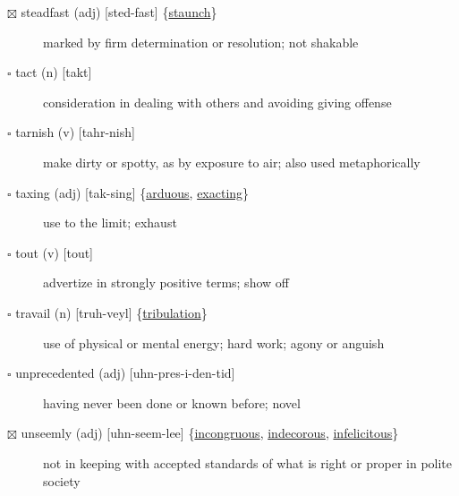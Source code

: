 \documentclass[11pt]{article}
\begin{document}
\begin{description}
\item[{$\boxtimes$ \label{orge0b688b}steadfast (adj) [sted-fast] \{\hyperref[org078ae16]{staunch}\}}] marked by firm determination or resolution; not shakable
\item[{$\square$ tact (n) [takt]}] consideration in dealing with others and avoiding giving offense
\item[{$\square$ tarnish (v) [tahr-nish]}] make dirty or spotty, as by exposure to air; also used metaphorically
\item[{$\square$ \label{org6476319}taxing (adj) [tak-sing] \{\hyperref[org544fb36]{arduous}, \hyperref[org7c24807]{exacting}\}}] use to the limit; exhaust
\item[{$\square$ tout (v) [tout]}] advertize in strongly positive terms; show off
\item[{$\square$ \label{orgde75c05}travail (n) [truh-veyl] \{\hyperref[orgdf85c85]{tribulation}\}}] use of physical or mental energy; hard work; agony or anguish
\item[{$\square$ unprecedented (adj) [uhn-pres-i-den-tid]}] having never been done or known before; novel
\item[{$\boxtimes$ \label{org5b5b913}unseemly (adj) [uhn-seem-lee] \{\hyperref[org42977a6]{incongruous}, \hyperref[org6f6aa07]{indecorous}, \hyperref[org04e38e0]{infelicitous}\}}] not in keeping with accepted standards of what is right or proper in polite society
\end{description}
\end{document}
